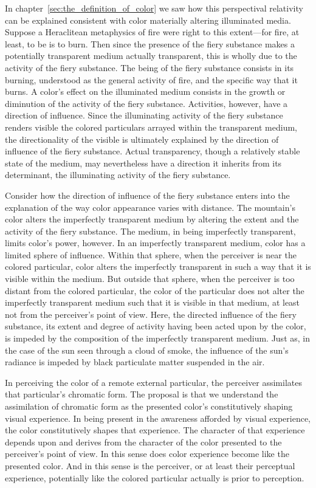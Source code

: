 In chapter~\ref{sec:the_definition_of_color} we saw how this perspectival relativity can be explained consistent with color materially altering illuminated media. Suppose a Heraclitean metaphysics of fire were right to this extent---for fire, at least, to be is to burn. Then since the presence of the fiery substance makes a potentially transparent medium actually transparent, this is wholly due to the activity of the fiery substance. The being of the fiery substance consists in its burning, understood as the general activity of fire, and the specific way that it burns. A color's effect on the illuminated medium consists in the growth or diminution of the activity of the fiery substance. Activities, however, have a direction of influence. Since the illuminating activity of the fiery substance renders visible the colored particulars arrayed within the transparent medium, the directionality of the visible is ultimately explained by the direction of influence of the fiery substance. Actual transparency, though a relatively stable state of the medium, may nevertheless have a direction it inherits from its determinant, the illuminating activity of the fiery substance.

Consider how the direction of influence of the fiery substance enters into the explanation of the way color appearance varies with distance. The mountain's color alters the imperfectly transparent medium by altering the extent and the activity of the fiery substance. The medium, in being imperfectly transparent, limits color's power, however. In an imperfectly transparent medium, color has a limited sphere of influence. Within that sphere, when the perceiver is near the colored particular, color alters the imperfectly transparent in such a way that it is visible within the medium. But outside that sphere, when the perceiver is too distant from the colored particular, the color of the particular does not alter the imperfectly transparent medium such that it is visible in that medium, at least not from the perceiver's point of view. Here, the directed influence of the fiery substance, its extent and degree of activity having been acted upon by the color, is impeded by the composition of the imperfectly transparent medium. Just as, in the case of the sun seen through a cloud of smoke, the influence of the sun's radiance is impeded by black particulate matter suspended in the air.

In perceiving the color of a remote external particular, the perceiver assimilates that particular's chromatic form. The proposal is that we understand the assimilation of chromatic form as the presented color's constitutively shaping visual experience. In being present in the awareness afforded by visual experience, the color constitutively shapes that experience. The character of that experience depends upon and derives from the character of the color presented to the perceiver's point of view. In this sense does color experience become like the presented color. And in this sense is the perceiver, or at least their perceptual experience, potentially like the colored particular actually is prior to perception.

